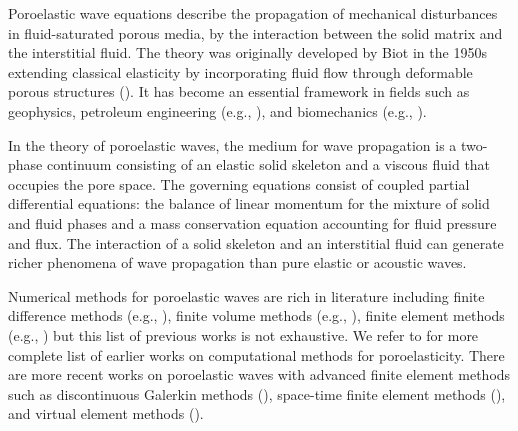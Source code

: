\documentclass[10pt,letterpaper]{amsart}
\theoremstyle{plain} %
\theoremstyle{remark} %
\begin{document}
Poroelastic wave equations describe the propagation of mechanical disturbances in fluid-saturated porous media, by the interaction between the solid matrix and the interstitial fluid. The theory was originally developed by Biot in the 1950s extending classical elasticity by incorporating fluid flow through deformable porous structures (\cite{Biot-low-frequency,Biot-high-frequency}). It has become an essential framework in fields such as geophysics, petroleum engineering (e.g., \cite{wang2000theory,coussy2004poromechanics,cheng2016poroelasticity,selvadurai2016thermo}), and biomechanics (e.g., \cite{Mow-Kuei-Lai-Armstrong:1980,Cowin:1999,ChouEtAl2016,VardakisEtAl2016,LeeAtEl:2019}).

In the theory of poroelastic waves, the medium for wave propagation is a two-phase continuum consisting of an elastic solid skeleton and a viscous fluid that occupies the pore space. The governing equations consist of coupled partial differential equations: the balance of linear momentum for the mixture of solid and fluid phases and a mass conservation equation accounting for fluid pressure and flux. The interaction of a solid skeleton and an interstitial fluid can generate richer phenomena of wave propagation than pure elastic or acoustic waves. 

Numerical methods for poroelastic waves are rich in literature including finite difference methods (e.g., \cite{Garg-Neyfeh-Good:1974,Dai:1996,Masson-Pride-Nihei:2006,Chiavassa-Lombard:2011}), finite volume methods (e.g., \cite{Lemoine-Ou-LeVeque:2013,Lemoine-Ou:2014}), finite element methods (e.g., \cite{Santos:1986b,Zienkiewicz-Shiomi:1984,Zienkiewicz:1990,laPuente-Dumbser-Kaser-Igel:2008}) but this list of previous works is not exhaustive. We refer to \cite{Carcione:2010} for more complete list of earlier works on computational methods for poroelasticity. There are more recent works on poroelastic waves with advanced finite element methods such as discontinuous Galerkin methods (\cite{Shukla-Chan-deHoop-Jaiswal:2020}), space-time finite element methods (\cite{Bause-Anselmann:2025,Kraus-Lymbery-Osthues:2025}), and virtual element methods (\cite{Chen-Liu-Zhang-Nie:2025}). 
\end{document}
